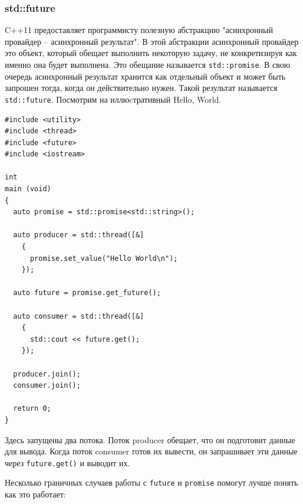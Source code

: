 \documentclass[a4paper,12pt,oneside]{article}
\begin{document}
\subsubsection{std::future}

C++11 предоставляет программисту полезную абстракцию "асинхронный провайдер -- асинхронный результат". В этой абстракции асинхронный провайдер это объект, который обещает выполнить некоторую задачу, не конкретизируя как именно она будет выполнена. Это обещание называется \lstinline!std::promise!. В свою очередь асинхронный результат хранится как отдельный объект и может быть запрошен тогда, когда он действительно нужен. Такой результат называется \lstinline!std::future!. Посмотрим на иллюcтративный Hello, World.

\begin{lstlisting}
#include <utility>
#include <thread>
#include <future>
#include <iostream>

int
main (void)
{
  auto promise = std::promise<std::string>();

  auto producer = std::thread([&]
    {
      promise.set_value("Hello World\n");
    });

  auto future = promise.get_future();

  auto consumer = std::thread([&]
    {
      std::cout << future.get();
    });

  producer.join();
  consumer.join();

  return 0;
}
\end{lstlisting}

Здесь запущены два потока. Поток producer обещает, что он подготовит данные для вывода. Когда поток consumer готов их вывести, он запрашивает эти данные через \lstinline!future.get()! и выводит их.

Несколько граничных случаев работы с \lstinline!future! и \lstinline!promise! помогут лучше понять как это работает:
\end{document}
